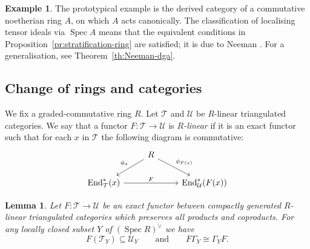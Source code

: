 \documentclass{amsart}[a4]
\newtheorem{lemma}[theorem]{Lemma}
\theoremstyle{definition}
\newtheorem{example}[theorem]{Example}
\theoremstyle{remark}
\numberwithin{equation}{section}
\newcommand{\End}{\operatorname{End}}
\newcommand{\Spec}{\operatorname{Spec}}
\newcommand{\cat}{\mathcal}
\let\Gamma\varGamma
\begin{document}
\begin{example}
  The prototypical example is the derived category of  a
  commutative noetherian ring $A$, on which $A$ acts canonically. The
  classification of localising tensor ideals via $\Spec A$ means that the
  equivalent conditions in Proposition~\ref{pr:stratification-ring} are satisfied; it is
  due to  Neeman \cite{Neeman:1992a}. For a generalisation, see Theorem~\ref{th:Neeman-dga}.
\end{example}


\subsection*{Change of rings and categories}

We fix a graded-commutative ring $R$. Let $\cat T$ and $\cat U$ be
$R$-linear triangulated categories. We say that a functor
$F\colon \cat T\to \cat U$ is \emph{$R$-linear} if it is an exact
functor such that for each $x$ in $\cat T$ the following diagram is
commutative:
\[
  \begin{tikzcd}
    &R\ar[ld,swap,"\phi_x"]\ar[rd,"\phi_{F(x)}"]\\
    \End^*_{\cat T}(x)\ar[rr,"F"]&&   \End^*_{\cat U}(F(x))
  \end{tikzcd}
\]

\begin{lemma}
\label{le:change-cats}
Let $F\colon\cat T\to \cat U$ be an exact functor between compactly
generated $R$-linear triangulated categories which preserves all
products and coproducts. For any locally closed subset $Y$ of
$(\Spec R)^\vee$ we have
\[F(\cat T_{Y})\subseteq\cat U_{Y}\qquad\text{and}\qquad
F\Gamma_{Y}\cong\Gamma_{Y}F .
\]
\end{lemma}
\end{document}
